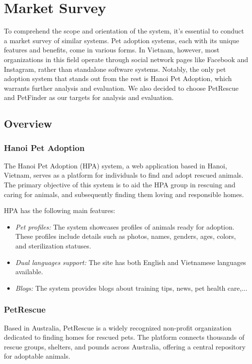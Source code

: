 \section{Market Survey}
To comprehend the scope and orientation of the system, it’s essential to conduct a market survey of similar systems. Pet adoption systems, each with its unique features and benefits, come in various forms. In Vietnam, however, most organizations in this field operate through social network pages like Facebook and Instagram, rather than standalone software systems. Notably, the only pet adoption system that stands out from the rest is Hanoi Pet Adoption, which warrants further analysis and evaluation. We also decided to choose PetRescue and PetFinder as our targets for analysis and evaluation.

\subsection{Overview}
\subsubsection*{Hanoi Pet Adoption}
The Hanoi Pet Adoption (HPA) system, a web application based in Hanoi, Vietnam, serves as a platform for individuals to find and adopt rescued animals. The primary objective of this system is to aid the HPA group in rescuing and caring for animals, and subsequently finding them loving and responsible homes.

HPA has the following main features:
\begin{itemize}
  \item \textit{Pet profiles:} The system showcases profiles of animals ready for adoption. These profiles include details such as photos, names, genders, ages, colors, and sterilization statuses.
  \item \textit{Dual languages support:} The site has both English and Vietnamese languages available.
  \item \textit{Blogs:}  The system provides blogs about training tips, news, pet health care,...
\end{itemize}

\subsubsection*{PetRescue}

Based in Australia, PetRescue is a widely recognized non-profit organization dedicated to finding homes for rescued pets. The platform connects thousands of rescue groups, shelters, and pounds across Australia, offering a central repository for adoptable animals.

